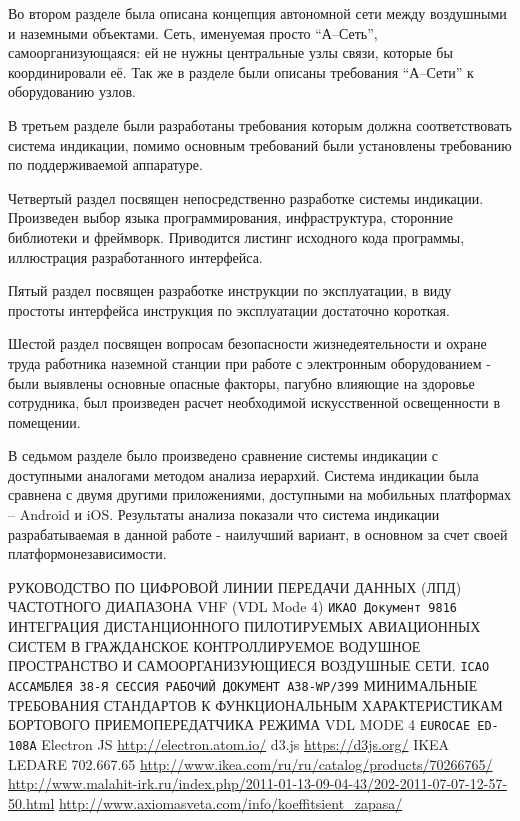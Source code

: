 \documentclass[a4paper,12pt]{report} %
\begin{document}
Во втором разделе была описана концепция автономной сети между воздушными и
наземными объектами. Сеть, именуемая просто ``А--Сеть'', самоорганизующаяся: ей
не нужны центральные узлы связи, которые бы координировали её. Так же в разделе
были описаны требования ``А--Сети'' к оборудованию узлов.

В третьем разделе были разработаны требования которым должна соответствовать
система индикации, помимо основным требований были установлены требованию по
поддерживаемой аппаратуре.

Четвертый раздел посвящен непосредственно разработке системы индикации.
Произведен выбор языка программирования, инфраструктура, сторонние библиотеки и
фреймворк. Приводится листинг исходного кода программы, иллюстрация
разработанного интерфейса.

Пятый раздел посвящен разработке инструкции по эксплуатации, в виду простоты
интерфейса инструкция по эксплуатации достаточно короткая.

Шестой раздел посвящен вопросам безопасности жизнедеятельности и охране труда
работника наземной станции при работе с электронным оборудованием - были
выявлены основные опасные факторы, пагубно влияющие на здоровье сотрудника, был
произведен расчет необходимой искусственной освещенности в помещении.

В седьмом разделе было произведено сравнение системы индикации с доступными
аналогами методом анализа иерархий. Система индикации была сравнена с двумя
другими приложениями, доступными на мобильных платформах -- Android и iOS.
Результаты анализа показали что система индикации разрабатываемая в данной
работе - наилучший вариант, в основном за счет своей платформонезависимости.
\newpage


\begin{thebibliography}{9}
  РУКОВОДСТВО ПО ЦИФРОВОЙ ЛИНИИ ПЕРЕДАЧИ ДАННЫХ (ЛПД) ЧАСТОТНОГО ДИАПАЗОНА VHF
  (VDL Mode 4)
  \texttt{ИКАО Документ 9816}
  ИНТЕГРАЦИЯ ДИСТАНЦИОННОГО ПИЛОТИРУЕМЫХ АВИАЦИОННЫХ СИСТЕМ В ГРАЖДАНСКОЕ
  КОНТРОЛЛИРУЕМОЕ ВОДУШНОЕ ПРОСТРАНСТВО И САМООРГАНИЗУЮЩИЕСЯ ВОЗДУШНЫЕ СЕТИ.
  \texttt{ICAO АССАМБЛЕЯ 38-Я СЕССИЯ РАБОЧИЙ ДОКУМЕНТ A38-WP/399}
  МИНИМАЛЬНЫЕ ТРЕБОВАНИЯ СТАНДАРТОВ К ФУНКЦИОНАЛЬНЫМ ХАРАКТЕРИСТИКАМ БОРТОВОГО
  ПРИЕМОПЕРЕДАТЧИКА РЕЖИМА VDL MODE 4 \texttt{EUROCAE ED-108A}
  Electron JS \url{http://electron.atom.io/}
  d3.js \url{https://d3js.org/}
  IKEA LEDARE 702.667.65 \url{http://www.ikea.com/ru/ru/catalog/products/70266765/}
  \url{http://www.malahit-irk.ru/index.php/2011-01-13-09-04-43/202-2011-07-07-12-57-50.html}
  \url{http://www.axiomasveta.com/info/koeffitsient_zapasa/}
\end{thebibliography}
\end{document}
